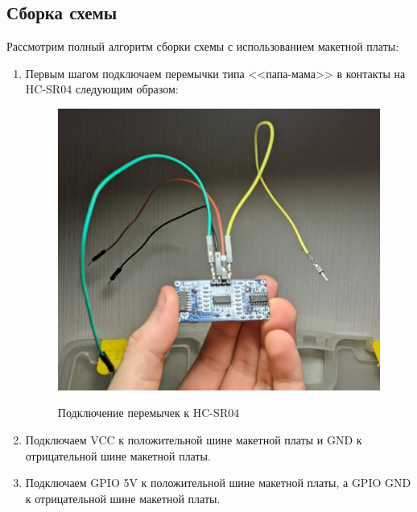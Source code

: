 \documentclass[a4paper, 14pt]{article}
\begin{document}
\subsection{Сборка схемы}

Рассмотрим полный алгоритм сборки схемы с использованием макетной платы:

\begin{enumerate}
	\item Первым шагом подключаем перемычки типа <<папа-мама>> в контакты на HC-SR04 следующим образом:
	      \begin{figure}[H]
		      \centering
		      \includegraphics[width=12cm]{screenshots/6.png}\\
		      \caption{Подключение перемычек к HC-SR04}
	      \end{figure}
	\item Подключаем VCC к положительной шине макетной платы и GND к отрицательной шине макетной платы.
	\item Подключаем GPIO 5V к положительной шине макетной платы, а GPIO GND к отрицательной шине макетной платы.
	      \begin{figure}[H]
		      \centering

\end{figure}
\end{enumerate}
\end{document}
